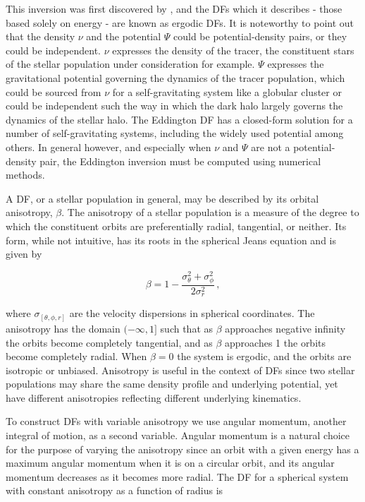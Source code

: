 This inversion was first discovered by \textcite{eddington16}, and the DFs which it describes - those based solely on energy - are known as ergodic DFs. It is noteworthy to point out that the density $\nu$ and the potential $\Psi$ could be potential-density pairs, or they could be independent. $\nu$ expresses the density of the tracer, the constituent stars of the stellar population under consideration for example. $\Psi$ expresses the gravitational potential governing the dynamics of the tracer population, which could be sourced from $\nu$ for a self-gravitating system like a globular cluster or could be independent such the way in which the dark halo largely governs the dynamics of the stellar halo. The Eddington DF has a closed-form solution for a number of self-gravitating systems, including the widely used \textcite{hernquist90} potential among others. In general however, and especially when $\nu$ and $\Psi$ are not a potential-density pair, the Eddington inversion must be computed using numerical methods.

A DF, or a stellar population in general, may be described by its orbital anisotropy, $\beta$. The anisotropy of a stellar population is a measure of the degree to which the constituent orbits are preferentially radial, tangential, or neither. Its form, while not intuitive, has its roots in the spherical Jeans equation and is given by 

\begin{equation}
    \label{ch1:eq:anisotropy}
    \beta = 1 - \frac{\sigma_{\theta}^{2} + \sigma_{\phi}^{2}}{2\sigma_{r}^{2}}\,,
\end{equation}

\noindent where $\sigma_{[\theta, \phi, r]}$ are the velocity dispersions in spherical coordinates. The anisotropy has the domain $(-\infty,1]$ such that as $\beta$ approaches negative infinity the orbits become completely tangential, and as $\beta$ approaches 1 the orbits become completely radial. When $\beta=0$ the system is ergodic, and the orbits are isotropic or unbiased. Anisotropy is useful in the context of DFs since two stellar populations may share the same density profile and underlying potential, yet have different anisotropies reflecting different underlying kinematics. 

To construct DFs with variable anisotropy we use angular momentum, another integral of motion, as a second variable. Angular momentum is a natural choice for the purpose of varying the anisotropy since an orbit with a given energy has a maximum angular momentum when it is on a circular orbit, and its angular momentum decreases as it becomes more radial. The DF for a spherical system with constant anisotropy as a function of radius is

